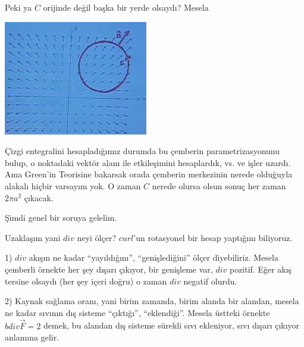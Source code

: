 \documentclass[12pt,fleqn]{article}\usepackage{../../common}
\begin{document}
Peki ya $C$ orijinde değil başka bir yerde olsaydı? Mesela 

\begin{center}
\includegraphics[height=5cm]{23_9.png}
\end{center}

Çizgi entegralini hesapladığımız durumda bu çemberin parametrizasyonunu
bulup, o noktadaki vektör alanı ile etkileşimini hesaplardık, vs. ve işler
uzardı. Ama Green'in Teorisine bakarsak orada çemberin merkezinin nerede
olduğuyla alakalı hiçbir varsayım yok. O zaman $C$ nerede olursa olsun
sonuç her zaman $2\pi a^2$ çıkacak. 

Şimdi genel bir soruya gelelim. 

Uzaklaşım yani $div$ neyi ölçer? $curl$'un rotasyonel bir hesap yaptığını
biliyoruz. 

1) $div$ akışın ne kadar ``yayıldığını'', ``genişlediğini'' ölçer
diyebiliriz. Mesela çemberli örnekte her şey dışarı çıkıyor, bir genişleme
var, $div$ pozitif. Eğer akış tersine olsaydı (her şey içeri doğru) o zaman
$div$ negatif olurdu. 

2) Kaynak sağlama oranı, yani birim zamanda, birim alanda bir alandan,
mesela ne kadar sıvının dış sisteme ``çıktığı'', ``eklendiği''. Mesela
üstteki örnekte $bdiv \vec{F} = 2$ demek, bu alandan dış sisteme sürekli
sıvı ekleniyor, sıvı dışarı çıkıyor anlamına gelir.
\end{document}
